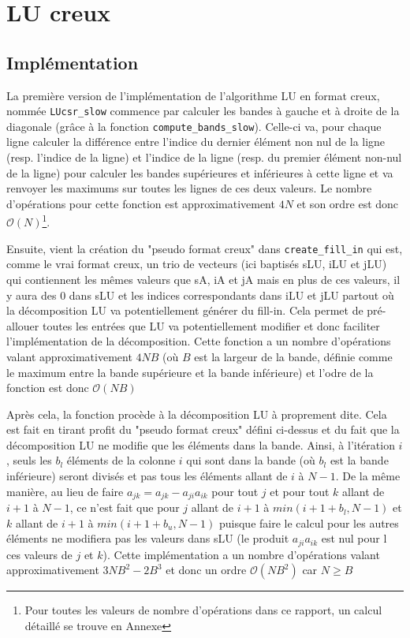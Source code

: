 \documentclass[11pt]{article}
\begin{document}
\section{LU creux}
\vspace{-8pt}
\subsection{Implémentation}
\vspace{-5pt}
La première version de l'implémentation de l'algorithme LU en format creux, nommée \texttt{LUcsr\_slow} commence par calculer les bandes à gauche et à droite de la diagonale (grâce à la fonction \texttt{compute\_bands\_slow}). Celle-ci va, pour chaque ligne calculer la différence entre l'indice du dernier élément non nul de la ligne (resp. l'indice de la ligne) et l'indice  de la ligne (resp. du premier élément non-nul de la ligne) pour calculer les bandes supérieures et inférieures à cette ligne et va renvoyer les maximums sur toutes les lignes de ces deux valeurs. Le nombre d'opérations pour cette fonction est approximativement $4N$ et son ordre est donc $\mathcal{O}(N)$\footnote{Pour toutes les valeurs de nombre d'opérations dans ce rapport, un calcul détaillé se trouve en Annexe}.\\
\vspace{-8pt}

Ensuite, vient la création du "pseudo format creux" dans \texttt{create\_fill\_in} qui est, comme le vrai format creux, un trio de vecteurs (ici baptisés sLU, iLU et jLU) qui contiennent les mêmes valeurs que sA, iA et jA mais en plus de ces valeurs, il y aura des 0 dans sLU et les indices correspondants dans iLU et jLU partout où la décomposition LU va potentiellement générer du fill-in. Cela permet de pré-allouer toutes les entrées que LU va potentiellement modifier et donc faciliter l'implémentation de la décomposition. Cette fonction a un nombre d'opérations valant approximativement $4NB$ (où $B$ est la largeur de la bande, définie comme le maximum entre la bande supérieure et la bande inférieure) et l'odre de la fonction est donc $\mathcal{O}(NB)$\\ 
\vspace{-8pt}

Après cela, la fonction procède à la décomposition LU à proprement dite. Cela est fait en tirant profit du "pseudo format creux" défini ci-dessus et du fait que la décomposition LU ne modifie que les éléments dans la bande. Ainsi, à l'itération $i$, seuls les $b_l$ éléments de la colonne $i$ qui sont dans la bande (où $b_l$ est la bande inférieure) seront divisés et pas tous les éléments allant de $i$ à $N-1$. De la même manière, au lieu de faire $a_{jk} = a_{jk} - a_{ji}a_{ik}$ pour tout $j$ et pour tout $k$ allant de $i+1$ à $N-1$, ce n'est fait que pour $j$ allant de $i+1$ à $min(i+1+b_l, N-1)$ et $k$ allant de $i+1$ à $min(i+1+b_u, N-1)$ puisque faire le calcul pour les autres éléments ne modifiera pas les valeurs dans sLU (le produit $a_{ji}a_{ik}$ est nul pour l
ces valeurs de $j$ et $k$). Cette implémentation a un nombre d'opérations valant approximativement $3NB^2 - 2B^3$ et donc un ordre $\mathcal{O}(NB^2)$ car $N \ge B$\\
\vspace{-8pt}
\end{document}
